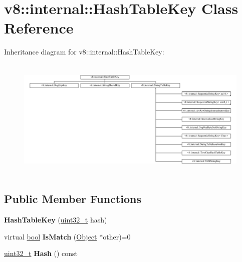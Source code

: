 \hypertarget{classv8_1_1internal_1_1HashTableKey}{}\section{v8\+:\+:internal\+:\+:Hash\+Table\+Key Class Reference}
\label{classv8_1_1internal_1_1HashTableKey}
Inheritance diagram for v8\+:\+:internal\+:\+:Hash\+Table\+Key\+:\begin{figure}[H]
\begin{center}
\leavevmode
\includegraphics[height=5.855514cm]{classv8_1_1internal_1_1HashTableKey}
\end{center}
\end{figure}
\subsection*{Public Member Functions}
\begin{DoxyCompactItemize}
\item 
\mbox{\label{classv8_1_1internal_1_1HashTableKey_a56f99a0277f598a4cf26bcbaf6476ac9}} 
{\bfseries Hash\+Table\+Key} (\mbox{\hyperlink{classuint32__t}{uint32\+\_\+t}} hash)
\item 
\mbox{\label{classv8_1_1internal_1_1HashTableKey_a2ab80629572d6a06beea7d0f74cb5b20}} 
virtual \mbox{\hyperlink{classbool}{bool}} {\bfseries Is\+Match} (\mbox{\hyperlink{classv8_1_1internal_1_1Object}{Object}} $\ast$other)=0
\item 
\mbox{\label{classv8_1_1internal_1_1HashTableKey_a2839dcede7a5087cadaff5180ac4ac34}} 
\mbox{\hyperlink{classuint32__t}{uint32\+\_\+t}} {\bfseries Hash} () const
\end{DoxyCompactItemize}
